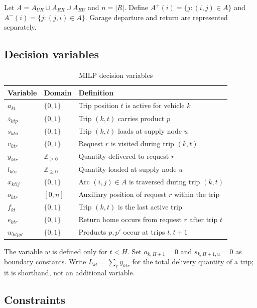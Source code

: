 Let $A=A_{UR}\cup A_{RR}\cup A_{RU}$ and $n=|R|$. Define
$A^+(i)=\{j:(i,j)\in A\}$ and $A^-(i)=\{j:(j,i)\in A\}$.
Garage departure and return are represented separately.

\subsection{Decision variables}
\begin{table}[htbp]
\centering\small
\caption{MILP decision variables}\label{tab:milp-variables}
\begin{tabularx}{\textwidth}{@{}llX@{}}
\toprule Variable & Domain & Definition \\ \midrule
$a_{kt}$ & $\{0,1\}$ & Trip position $t$ is active for vehicle $k$ \\
$z_{ktp}$ & $\{0,1\}$ & Trip $(k,t)$ carries product $p$ \\
$s_{ktu}$ & $\{0,1\}$ & Trip $(k,t)$ loads at supply node $u$ \\
$v_{ktr}$ & $\{0,1\}$ & Request $r$ is visited during trip $(k,t)$ \\
$y_{ktr}$ & $\mathbb{Z}_{\geq0}$ & Quantity delivered to request $r$ \\
$l_{ktu}$ & $\mathbb{Z}_{\geq0}$ & Quantity loaded at supply node $u$ \\
$x_{ktij}$ & $\{0,1\}$ & Arc $(i,j)\in A$ is traversed during trip $(k,t)$ \\
$o_{ktr}$ & $[0,n]$ & Auxiliary position of request $r$ within the trip \\
$f_{kt}$ & $\{0,1\}$ & Trip $(k,t)$ is the last active trip \\
$e_{ktr}$ & $\{0,1\}$ & Return home occurs from request $r$ after trip $t$ \\
$w_{ktpp'}$ & $\{0,1\}$ & Products $p,p'$ occur at trips $t,t+1$ \\
\bottomrule
\end{tabularx}
\end{table}

The variable $w$ is defined only for $t<H$. Set $a_{k,H+1}=0$ and
$s_{k,H+1,u}=0$ as boundary constants. Write $L_{kt}=\sum_ry_{ktr}$ for the
total delivery quantity of a trip; it is shorthand, not an additional variable.

\subsection{Constraints}
